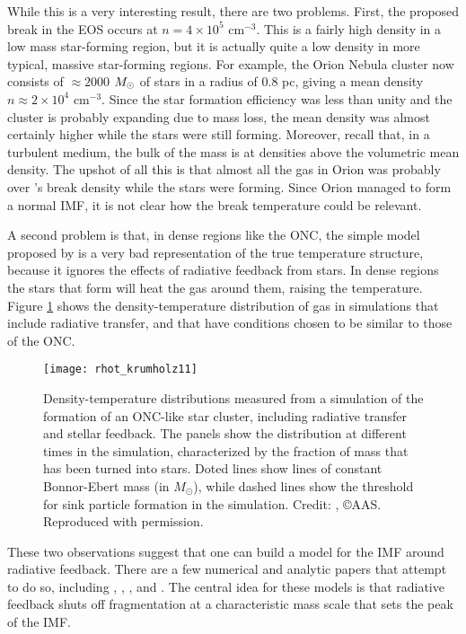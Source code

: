 While this is a very interesting result, there are two problems. First, the proposed break in the EOS occurs at $n=4\times 10^5$ cm$^{-3}$. This is a fairly high density in a low mass star-forming region, but it is actually quite a low density in more typical, massive star-forming regions. For example, the Orion Nebula cluster now consists of $\approx 2000$ $M_{\odot}$ of stars in a radius of $0.8$ pc, giving a mean density $n\approx 2\times 10^4$ cm$^{-3}$. Since the star formation efficiency was less than unity and the cluster is probably expanding due to mass loss, the mean density was almost certainly higher while the stars were still forming. Moreover, recall that, in a turbulent medium, the bulk of the mass is at densities above the volumetric mean density. The upshot of all this is that almost all the gas in Orion was probably over \citet{larson05a}'s break density while the stars were forming. Since Orion managed to form a normal IMF, it is not clear how the break temperature could be relevant.

A second problem is that, in dense regions like the ONC, the simple model proposed by \citet{larson05a} is a very bad representation of the true temperature structure, because it ignores the effects of radiative feedback from stars. In dense regions the stars that form will heat the gas around them, raising the temperature. Figure \ref{fig:rhot_krumholz11} shows the density-temperature distribution of gas in simulations that include radiative transfer, and that have conditions chosen to be similar to those of the ONC.

\begin{figure}
\texttt{[image: rhot\_krumholz11]}
\caption[Density-temperature distribution from a simulation of the formation of the ONC]{
\label{fig:rhot_krumholz11}
Density-temperature distributions measured from a simulation of the formation of an ONC-like star cluster, including radiative transfer and stellar feedback. The panels show the distribution at different times in the simulation, characterized by the fraction of mass that has been turned into stars. Doted lines show lines of constant Bonnor-Ebert mass (in $M_\odot$), while dashed lines show the threshold for sink particle formation in the simulation. Credit: \citet{krumholz11c}, \copyright AAS. Reproduced with permission.
}
\end{figure}

These two observations suggest that one can build a model for the IMF around radiative feedback. There are a few numerical and analytic papers that attempt to do so, including \citet{bate09a, bate12a}, \citet{krumholz11e}, \citet{krumholz12b}, and \citet{guszejnov16a}. The central idea for these models is that radiative feedback shuts off fragmentation at a characteristic mass scale that sets the peak of the IMF.


